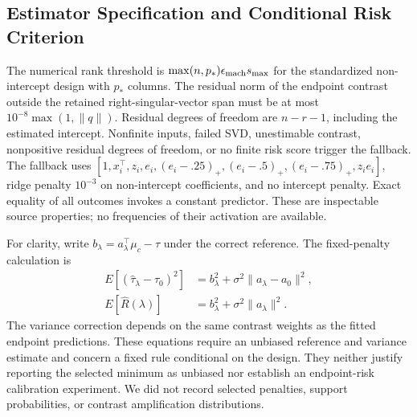 \documentclass{article}
\newcommand{\gate}{\tau}
\begin{document}
\subsection{Estimator Specification and Conditional Risk Criterion}
The numerical rank threshold is $\max(n,p_*)\epsilon_{\rm mach}s_{\max}$ for the standardized non-intercept design with $p_*$ columns. The residual norm of the endpoint contrast outside the retained right-singular-vector span must be at most $10^{-8}\max(1,\|q\|)$. Residual degrees of freedom are $n-r-1$, including the estimated intercept. Nonfinite inputs, failed SVD, unestimable contrast, nonpositive residual degrees of freedom, or no finite risk score trigger the fallback. The fallback uses $[1,x_i^\top,z_i,e_i,(e_i-.25)_+,(e_i-.5)_+,(e_i-.75)_+,z_ie_i]$, ridge penalty $10^{-3}$ on non-intercept coefficients, and no intercept penalty. Exact equality of all outcomes invokes a constant predictor. These are inspectable source properties; no frequencies of their activation are available.

For clarity, write $b_\lambda=a_\lambda^\top\mu_c-\gate$ under the correct reference. The fixed-penalty calculation is
\begin{align}
E[(\widehat\gate_\lambda-\widehat\gate_0)^2]
 &=b_\lambda^2+\sigma^2\|a_\lambda-a_0\|^2,\\
E[\widehat R(\lambda)]
 &=b_\lambda^2+\sigma^2\|a_\lambda\|^2.
\end{align}
The variance correction depends on the same contrast weights as the fitted endpoint predictions. These equations require an unbiased reference and variance estimate and concern a fixed rule conditional on the design. They neither justify reporting the selected minimum as unbiased nor establish an endpoint-risk calibration experiment. We did not record selected penalties, support probabilities, or contrast amplification distributions.
\end{document}

